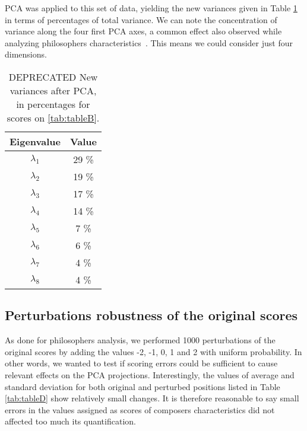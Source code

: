\documentclass[
 aip,
 jmp,
 amsmath,amssymb,
 reprint,
]{revtex4-1}
\begin{document}
PCA was applied to this set of data, yielding the new variances given
in Table \ref{tab:tableC} in terms of percentages of total variance.
We can note the concentration of variance along the four
first PCA axes, a common effect also observed while analyzing
philosophers characteristics~\cite{Fabbri}. This means we could
consider just four dimensions.

\begin{table}[ht]
\caption{\label{tab:tableC} DEPRECATED New variances after PCA, in percentages for
  scores on \ref{tab:tableB}.}

\begin{tabular}{|c||c|}
\hline
Eigenvalue  & Value     \\ \hline

$\lambda_1$ &  29 \% \\
$\lambda_2$ &  19 \% \\
$\lambda_3$ &  17 \% \\
$\lambda_4$ &  14 \% \\
$\lambda_5$ &   7 \% \\
$\lambda_6$ &   6 \% \\
$\lambda_7$ &   4 \% \\
$\lambda_8$ &   4 \% \\
\hline

\end{tabular}
\end{table}

\subsection{Perturbations robustness of the original scores}

As done for philosophers analysis, we performed 1000 perturbations of
the original scores by adding the values -2, -1, 0, 1 and 2 with
uniform probability. In other words, we wanted to test if scoring
errors could be sufficient to cause relevant effects
on the PCA projections. Interestingly, the values of average and
standard deviation for both original and perturbed positions listed in Table
\ref{tab:tableD} show relatively small changes. It is therefore
reasonable to say small errors in the values assigned as scores of composers
characteristics did not affected too much its quantification.
\end{document}
